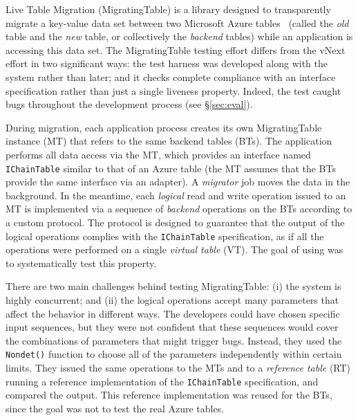 Live Table Migration (MigratingTable) is a library designed to transparently migrate a key-value data set between two Microsoft Azure tables~\cite{azure-table} (called the \emph{old} table and the \emph{new} table, or collectively the \emph{backend} tables) while an application is accessing this data set. The MigratingTable testing effort differs from the vNext effort in two significant ways: the \psharp test harness was developed along with the system rather than later; and it checks complete compliance with an interface specification rather than just a single liveness property. Indeed, the \psharp test caught bugs throughout the development process (see \S\ref{sec:eval}).

%
During migration, each application process creates its own MigratingTable instance (MT) that refers to the same backend tables (BTs). The application performs all data access via the MT, which provides an interface named \texttt{IChainTable} similar to that of an Azure table (the MT assumes that the BTs provide the same interface via an adapter). A \emph{migrator} job moves the data in the background. In the meantime, each \emph{logical} read and write operation issued to an MT is implemented via a sequence of \emph{backend} operations on the BTs according to a custom protocol. The protocol is designed to guarantee that the output of the logical operations complies with the \texttt{IChainTable} specification, as if all the operations were performed on a single \emph{virtual table} (VT). The goal of using \psharp was to systematically test this property.

There are two main challenges behind testing MigratingTable: (i) the system is highly concurrent; and (ii) the logical operations accept many parameters that affect the behavior in different ways. The developers could have chosen specific input sequences, but they were not confident that these sequences would cover the combinations of parameters that might trigger bugs. Instead, they used the \psharp \texttt{Nondet()} function to choose all of the parameters independently within certain limits. They issued the same operations to the MTs and to a \emph{reference table} (RT) running a reference implementation of the \texttt{IChainTable} specification, and compared the output. This reference implementation was reused for the BTs, since the goal was not to test the real Azure tables.

